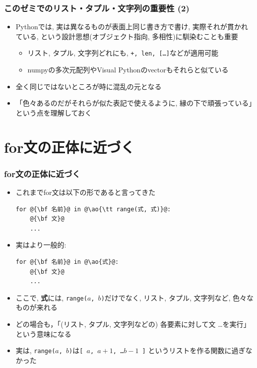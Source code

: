 \documentclass[10pt,dvipdfmx]{beamer}
\newcommand{\ao}[1]{{\color{blue}#1}}
\begin{document}
\begin{frame}[fragile]
\frametitle{このゼミでのリスト・タプル・文字列の重要性 (2)}
\begin{itemize}
\item Pythonでは, \ao{実は異なるものが表面上同じ書き方で書け,}
  実際それが貫かれている, 
  という設計思想(オブジェクト指向, 多相性)に馴染むことも重要
  \begin{itemize}
  \item リスト, タプル, 文字列どれにも, 
    {\tt +, len, [\ldots]}などが適用可能
  \item numpyの多次元配列やVisual Pythonのvectorもそれらと似ている
  \end{itemize}
\item 全く同じではないところが時に混乱の元となる
\item 「色々あるのだがそれらが似た表記で使えるように,
  縁の下で頑張っている」という点を理解しておく
\end{itemize}
\end{frame}


\section{for文の正体に近づく}

\begin{frame}[fragile]
\frametitle{for文の正体に近づく}
\begin{itemize}
\item これまでfor文は以下の形であると言ってきた
\begin{lstlisting}
for @{\bf 名前}@ in @\ao{\tt range(式, 式)}@:
    @{\bf 文}@
    ...
\end{lstlisting}
\item 実はより一般的:
\begin{lstlisting}
for @{\bf 名前}@ in @\ao{式}@:
    @{\bf 文}@
    ...
\end{lstlisting}
\item ここで, \ao{\bf 式}には, 
  {\tt range($a$, $b$)}だけでなく,
  リスト, タプル, 文字列など,
  色々なものが来れる
\item どの場合も，\ao{「(リスト, タプル, 文字列などの)
  各要素に対して文 \ldots を実行」}という意味になる
\item 実は, 
  {\tt range($a$, $b$)}は{\tt [ $a$, $a+1$, \ldots $b-1$ ]}
  というリストを作る関数に過ぎなかった
\end{itemize}
\end{frame}
\end{document}
